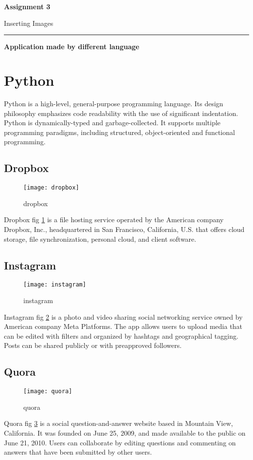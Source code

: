\documentclass[12 pt]{article}
\begin{document}
\begin{center}
\bf \huge Assignment 3
\end{center}
\begin{center}
\large{Inserting Images}
\end{center}
\hrule
\begin{center}
\bf \large Application made by different language
\end{center}

\section{Python}
Python is a high-level, general-purpose programming language. Its design philosophy emphasizes code readability with the use of significant indentation. Python is dynamically-typed and garbage-collected. It supports multiple programming paradigms, including structured, object-oriented and functional programming.

\subsection{Dropbox}
\begin{figure}[h]
\centering
\texttt{[image: dropbox]}
\caption{dropbox}
\label{fig1:dropbox}
\end{figure}
Dropbox fig \ref{fig1:dropbox} is a file hosting service operated by the American company Dropbox, Inc., headquartered in San Francisco, California, U.S. that offers cloud storage, file synchronization, personal cloud, and client software.

\subsection{Instagram}
\begin{figure}[h]
\centering
\texttt{[image: instagram]}
\caption{instagram}
\label{fig1:instagram}
\end{figure}
Instagram fig \ref{fig1:instagram} is a photo and video sharing social networking service owned by American company Meta Platforms. The app allows users to upload media that can be edited with filters and organized by hashtags and geographical tagging. Posts can be shared publicly or with preapproved followers.

\subsection{Quora}
\begin{figure}[h]
\centering
\texttt{[image: quora]}
\caption{quora}
\label{fig1:quora}
\end{figure}
Quora fig \ref{fig1:quora} is a social question-and-answer website based in Mountain View, California. It was founded on June 25, 2009, and made available to the public on June 21, 2010. Users can collaborate by editing questions and commenting on answers that have been submitted by other users.\\
\hrulefill
\end{document}
